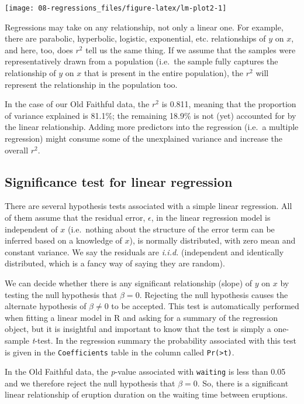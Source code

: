 \documentclass[english,10pt,a4paper,oneside]{book}
\theoremstyle{definition}
\theoremstyle{definition}
\theoremstyle{definition}
\theoremstyle{remark}
\begin{document}
\texttt{[image: 08-regressions\_files/figure-latex/lm-plot2-1]}

Regressions may take on any relationship, not only a linear one. For
example, there are parabolic, hyperbolic, logistic, exponential, etc.
relationships of \(y\) on \(x\), and here, too, does \(r^{2}\) tell us
the same thing. If we assume that the samples were representatively
drawn from a population (i.e.~the sample fully captures the relationship
of \(y\) on \(x\) that is present in the entire population), the
\(r^{2}\) will represent the relationship in the population too.

In the case of our Old Faithful data, the \(r^{2}\) is 0.811, meaning
that the proportion of variance explained is 81.1\%; the remaining
18.9\% is not (yet) accounted for by the linear relationship. Adding
more predictors into the regression (i.e.~a multiple regression) might
consume some of the unexplained variance and increase the overall
\(r^{2}\).

\subsection{Significance test for linear
regression}\label{significance-test-for-linear-regression}

There are several hypothesis tests associated with a simple linear
regression. All of them assume that the residual error, \(\epsilon\), in
the linear regression model is independent of \(x\) (i.e.~nothing about
the structure of the error term can be inferred based on a knowledge of
\(x\)), is normally distributed, with zero mean and constant variance.
We say the residuals are \emph{i.i.d.} (independent and identically
distributed, which is a fancy way of saying they are random).

We can decide whether there is any significant relationship (slope) of
\(y\) on \(x\) by testing the null hypothesis that \(\beta=0\).
Rejecting the null hypothesis causes the alternate hypothesis of
\(\beta \neq 0\) to be accepted. This test is automatically performed
when fitting a linear model in R and asking for a summary of the
regression object, but it is insightful and important to know that the
test is simply a one-sample \emph{t}-test. In the regression summary the
probability associated with this test is given in the
\texttt{Coefficients} table in the column called
\texttt{Pr(\textgreater{}\textbar{}t\textbar{})}.

In the Old Faithful data, the \emph{p}-value associated with
\texttt{waiting} is less than 0.05 and we therefore reject the null
hypothesis that \(\beta=0\). So, there is a significant linear
relationship of eruption duration on the waiting time between eruptions.
\end{document}
